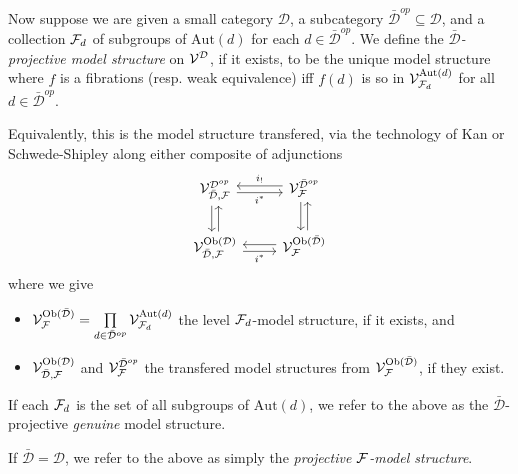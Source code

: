 \documentclass[a4paper,10pt]{article}%
\begin{document}
\begin{definition}
  \label{SUBD_PROJ_F_MODEL_STRUCTURE}
  Now suppose we are given a small category $\mathcal D$, a subcategory ${\bar{\mathcal D}^{op}} \subseteq \mathcal D$, and a collection $\mathcal F_d$ of subgroups of $\mathrm{Aut}(d)$ for each $d\in \bar{\mathcal D}^{op}$.
 We define the \textit{$\bar{\mathcal D}$-projective model structure} on $\mathcal V^{\mathcal D}$, if it exists, to be the unique model structure where $f$ is a fibrations (resp. weak equivalence) iff $f(d)$ is so in $\mathcal V^{\mathrm{Aut}(d)}_{\mathcal F_d}$ for all $d\in \bar{\mathcal D}^{op}$. 

Equivalently, this is the model structure transfered, via the technology of Kan \cite[11.6.1]{Hi03} or Schwede-Shipley \cite[2.3]{SS00} along either composite of adjunctions
  \begin{equation}
    \begin{tikzcd}
      \V^{\mathcal D^{op}}_{\bar{\mathcal D},\F} \arrow[d, shift right] \arrow[r, shift right, "i^*"'] & \V^{\bar{\mathcal D}^{op}}_{\F} \arrow[l, shift right, "i_!"'] \arrow[d, shift right] \label{D_BARD_F_EQ}\\
      \V^{\mathrm{Ob}(\mathcal D)}_{\bar{\mathcal D},\F} \arrow[r, shift right, "i^*"'] \arrow[u, shift right] & \V^{\mathrm{Ob}(\bar{\mathcal D})}_{\F} \arrow[l, shift right] \arrow[u, shift right]
    \end{tikzcd}
  \end{equation}
  where we give
  \begin{itemize}
  \item $\mathcal V^{\mathrm{Ob}(\bar{\mathcal D})}_{\mathcal F} = \mathop{\prod}\limits_{d\in \bar{\mathcal D}^{op}}\mathcal V^{\mathrm{Aut}(d)}_{\mathcal F_d}$ the level $\mathcal F_d$-model structure, if it exists, and
  \item $\mathcal V^{\mathrm{Ob}(\mathcal D)}_{\bar{\mathcal D},\mathcal F}$ and $\mathcal V_{\mathcal F}^{\bar{\mathcal D}^{op}}$ the transfered model structures from $\mathcal V^{\mathrm{Ob}(\bar{\mathcal D})}_{\mathcal F}$, if they exist.
  \end{itemize}
  
  If each $\mathcal F_d$ is the set of all subgroups of $\mathrm{Aut}(d)$, we refer to the above as the $\bar{\mathcal D}$-projective \textit{genuine} model structure. 

  If $\bar{\mathcal D} = \mathcal D$, we refer to the above as simply the \textit{projective $\mathcal F$-model structure}.
\end{definition}

 
\end{document}
